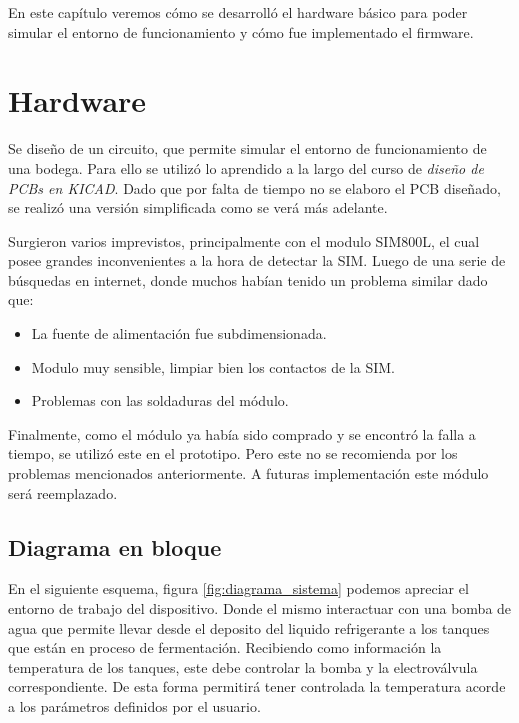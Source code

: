 En este capítulo veremos cómo se desarrolló el hardware básico para poder simular el entorno de funcionamiento y cómo fue implementado el firmware.

\section{Hardware}

Se diseño de un circuito, que permite simular el entorno de funcionamiento de una bodega. Para ello se utilizó lo aprendido a la largo del curso de \emph{diseño de PCBs en KICAD}. Dado que por falta de tiempo no se elaboro el PCB diseñado, se realizó una versión simplificada como se verá más adelante. 

Surgieron varios imprevistos, principalmente con el modulo SIM800L, el cual posee grandes inconvenientes a la hora de detectar la SIM. Luego de una serie de búsquedas en internet, donde muchos habían tenido un problema similar dado que:
\begin{itemize}
  \item La fuente de alimentación fue subdimensionada.
  \item Modulo muy sensible, limpiar bien los contactos de la SIM.
  \item Problemas con las soldaduras del módulo.
\end{itemize}
Finalmente, como el módulo ya había sido comprado y se encontró la falla a tiempo, se utilizó este en el prototipo.
Pero este no se recomienda por los problemas mencionados anteriormente. A futuras implementación este módulo será reemplazado.


\subsection{Diagrama en bloque}
En el siguiente esquema, figura \ref{fig:diagrama_sistema} podemos apreciar el entorno de trabajo del dispositivo. Donde el mismo   interactuar con una bomba de agua que permite llevar desde el deposito del liquido refrigerante a los tanques que están en proceso de fermentación.
Recibiendo como información la temperatura de los tanques, este debe controlar la bomba y la electroválvula correspondiente. De esta forma permitirá tener controlada la temperatura acorde a los parámetros definidos por el usuario. 


